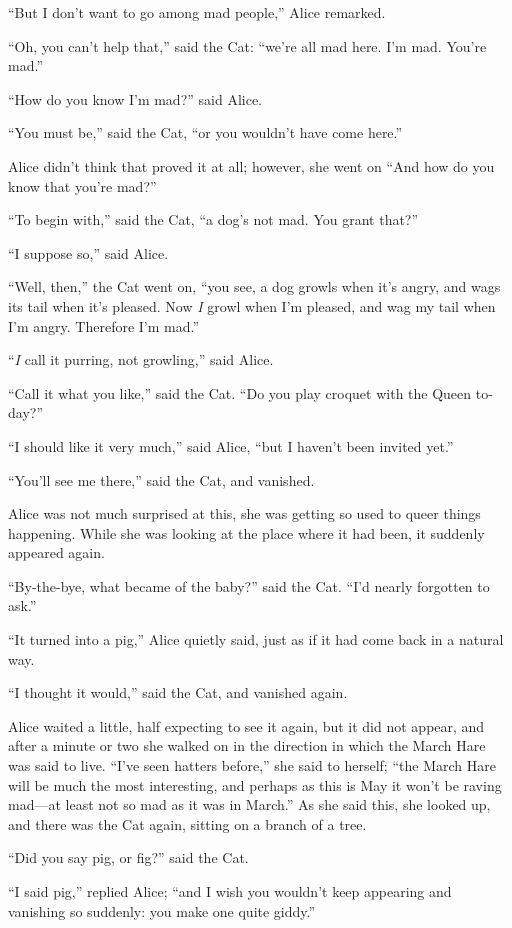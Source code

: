 \documentclass[book, 20pt]{extbook}
\begin{document}
``But I don't want to go among mad people,'' Alice remarked.

``Oh, you can't help that,'' said the Cat: ``we're all mad here. I'm
mad. You're mad.''

``How do you know I'm mad?'' said Alice.

``You must be,'' said the Cat, ``or you wouldn't have come here.''

Alice didn't think that proved it at all; however, she went on ``And how
do you know that you're mad?''

``To begin with,'' said the Cat, ``a dog's not mad. You grant that?''

``I suppose so,'' said Alice.

``Well, then,'' the Cat went on, ``you see, a dog growls when it's
angry, and wags its tail when it's pleased. Now \emph{I} growl when I'm
pleased, and wag my tail when I'm angry. Therefore I'm mad.''

``\emph{I} call it purring, not growling,'' said Alice.

``Call it what you like,'' said the Cat. ``Do you play croquet with the
Queen to-day?''

``I should like it very much,'' said Alice, ``but I haven't been invited
yet.''

``You'll see me there,'' said the Cat, and vanished.

Alice was not much surprised at this, she was getting so used to queer
things happening. While she was looking at the place where it had been,
it suddenly appeared again.

``By-the-bye, what became of the baby?'' said the Cat. ``I'd nearly
forgotten to ask.''

``It turned into a pig,'' Alice quietly said, just as if it had come
back in a natural way.

``I thought it would,'' said the Cat, and vanished again.

Alice waited a little, half expecting to see it again, but it did not
appear, and after a minute or two she walked on in the direction in
which the March Hare was said to live. ``I've seen hatters before,'' she
said to herself; ``the March Hare will be much the most interesting, and
perhaps as this is May it won't be raving mad---at least not so mad as
it was in March.'' As she said this, she looked up, and there was the
Cat again, sitting on a branch of a tree.

``Did you say pig, or fig?'' said the Cat.

``I said pig,'' replied Alice; ``and I wish you wouldn't keep appearing
and vanishing so suddenly: you make one quite giddy.''
\end{document}
